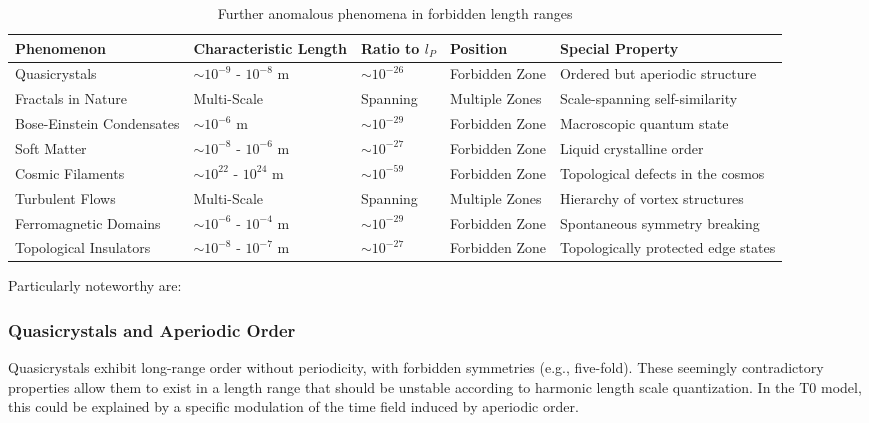 \documentclass[12pt,a4paper]{article}
\begin{document}
	\begin{table}[h]
		\centering
		\begin{adjustbox}{scale=0.65}
			\begin{tabular}{lllll}
				\hline
				\textbf{Phenomenon} & \textbf{Characteristic Length} & \textbf{Ratio to $l_P$} & \textbf{Position} & \textbf{Special Property} \\
				\hline
				Quasicrystals & $\sim 10^{-9}$ - $10^{-8}$ m & $\sim 10^{-26}$ & Forbidden Zone & Ordered but aperiodic structure \\
				Fractals in Nature & Multi-Scale & Spanning & Multiple Zones & Scale-spanning self-similarity \\
				Bose-Einstein Condensates & $\sim 10^{-6}$ m & $\sim 10^{-29}$ & Forbidden Zone & Macroscopic quantum state \\
				Soft Matter & $\sim 10^{-8}$ - $10^{-6}$ m & $\sim 10^{-27}$ & Forbidden Zone & Liquid crystalline order \\
				Cosmic Filaments & $\sim 10^{22}$ - $10^{24}$ m & $\sim 10^{-59}$ & Forbidden Zone & Topological defects in the cosmos \\
				Turbulent Flows & Multi-Scale & Spanning & Multiple Zones & Hierarchy of vortex structures \\
				Ferromagnetic Domains & $\sim 10^{-6}$ - $10^{-4}$ m & $\sim 10^{-29}$ & Forbidden Zone & Spontaneous symmetry breaking \\
				Topological Insulators & $\sim 10^{-8}$ - $10^{-7}$ m & $\sim 10^{-27}$ & Forbidden Zone & Topologically protected edge states \\
				\hline
			\end{tabular}
		\end{adjustbox}
		\caption{Further anomalous phenomena in forbidden length ranges}
		\label{tab:more_anomalies}
	\end{table}
	
	Particularly noteworthy are:
	
	\subsubsection{Quasicrystals and Aperiodic Order}
	
	Quasicrystals exhibit long-range order without periodicity, with forbidden symmetries (e.g., five-fold). These seemingly contradictory properties allow them to exist in a length range that should be unstable according to harmonic length scale quantization. In the T0 model, this could be explained by a specific modulation of the time field induced by aperiodic order.
	
\end{document}
